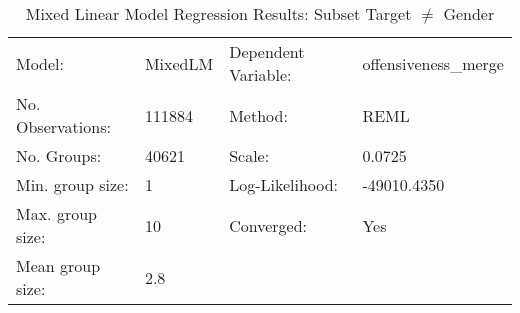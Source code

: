 \begin{table}
\caption{Mixed Linear Model Regression Results: Subset Target $\neq$ Gender}
\label{}
\begin{center}
\begin{tabular}{llll}
\hline
Model:            & MixedLM & Dependent Variable: & offensiveness\_merge  \\
No. Observations: & 111884  & Method:             & REML                  \\
No. Groups:       & 40621   & Scale:              & 0.0725                \\
Min. group size:  & 1       & Log-Likelihood:     & -49010.4350           \\
Max. group size:  & 10      & Converged:          & Yes                   \\
Mean group size:  & 2.8     &                     &                       \\
\hline
\end{tabular}
\end{center}


\end{table}
